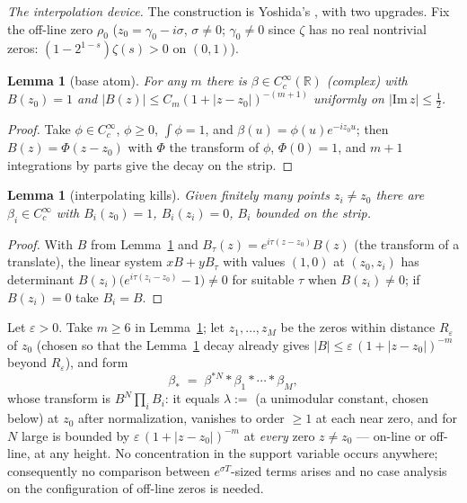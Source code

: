\documentclass[11pt,reqno]{amsart}
\theoremstyle{plain}
\newtheorem{lemma}[theorem]{Lemma}
\theoremstyle{definition}
\theoremstyle{remark}
\newcommand{\R}{\mathbb{R}}
\begin{document}
\emph{The interpolation device.} The construction is Yoshida's
\cite[Lemma~1 and Prop.~1(2)]{Yoshida92}, with two upgrades. Fix the off-line zero
$\rho_0$ ($z_0 = \gamma_0 - i\sigma$, $\sigma \ne 0$; $\gamma_0 \ne 0$ since $\zeta$ has no
real nontrivial zeros: $(1 - 2^{1-s})\zeta(s) > 0$ on $(0,1)$).

\begin{lemma}[base atom]\label{lem:SL1}
For any $m$ there is $\beta \in C_c^\infty(\R)$ (complex) with $B(z_0) = 1$ and
$|B(z)| \le C_m (1 + |z - z_0|)^{-(m+1)}$ uniformly on $|\mathrm{Im}\, z| \le \tfrac12$.
\end{lemma}

\begin{proof}
Take $\phi \in C_c^\infty$, $\phi \ge 0$, $\int \phi = 1$, and $\beta(u) = \phi(u)
e^{-i z_0 u}$; then $B(z) = \Phi(z - z_0)$ with $\Phi$ the transform of $\phi$, $\Phi(0)=1$,
and $m+1$ integrations by parts give the decay on the strip.
\end{proof}

\begin{lemma}[interpolating kills]\label{lem:SL2}
Given finitely many points $z_i \ne z_0$ there are $\beta_i \in C_c^\infty$ with
$B_i(z_0) = 1$, $B_i(z_i) = 0$, $B_i$ bounded on the strip.
\end{lemma}

\begin{proof}
With $B$ from Lemma~\ref{lem:SL1} and $B_\tau(z) = e^{i\tau(z - z_0)} B(z)$ (the transform
of a translate), the linear system $xB + yB_\tau$ with values $(1, 0)$ at $(z_0, z_i)$ has
determinant $B(z_i)\big(e^{i\tau(z_i - z_0)} - 1\big) \ne 0$ for suitable $\tau$ when
$B(z_i) \ne 0$; if $B(z_i) = 0$ take $B_i = B$.
\end{proof}

Let $\varepsilon > 0$. Take $m \ge 6$ in Lemma~\ref{lem:SL1}; let $z_1, \dots, z_M$ be the
zeros within distance $R_\varepsilon$ of $z_0$ (chosen so that the Lemma~\ref{lem:SL1} decay
already gives $|B| \le \varepsilon\,(1+|z - z_0|)^{-m}$ beyond $R_\varepsilon$), and form
\[
\beta_* \;=\; \beta^{*N} * \beta_1 * \cdots * \beta_M ,
\]
whose transform is $B^N \prod_i B_i$: it equals $\lambda := $ (a unimodular constant, chosen
below) at $z_0$ after normalization, vanishes to order $\ge 1$ at each near zero, and for $N$
large is bounded by $\varepsilon\, (1 + |z - z_0|)^{-m}$ at \emph{every} zero
$z \neq z_0$ --- on-line or off-line, at any height. No concentration in the support
variable occurs anywhere; consequently no comparison between $e^{\sigma T}$-sized terms
arises and no case analysis on the configuration of off-line zeros is needed.
\end{document}
